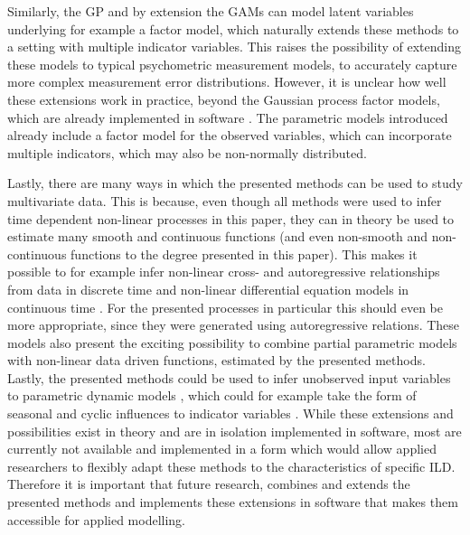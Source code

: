 \documentclass[man, floatsintext]{apa7}
\begin{document}
Similarly, the GP and by extension the GAMs can model latent variables
underlying for example a factor model, which naturally extends these methods to
a setting with multiple indicator variables. This raises the possibility of
extending these models to typical psychometric measurement models, to
accurately capture more complex measurement error distributions. However, it
is unclear how well these extensions work in practice, beyond the Gaussian
process factor models, which are already implemented in software
\parencite{clark_dynamic_2023}. The parametric models introduced already
include a factor model for the observed variables, which can incorporate
multiple indicators, which may also be non-normally distributed.

Lastly, there are many ways in which the presented methods can be used to study
multivariate data. This is because, even though all methods were used to infer
time dependent non-linear processes in this paper, they can in theory be used
to estimate many smooth and continuous functions (and even non-smooth and
non-continuous functions to the degree presented in this paper). This makes it
possible to for example infer non-linear cross- and autoregressive
relationships from data in discrete time \parencite{wood_generalized_2006,
  rasmussen_gaussian_2006, eleftheriadis_identification_2017} and non-linear
differential equation models in continuous time
\parencite{yildiz_learning_2018}. For the presented processes in particular
this should even be more appropriate, since they were generated using
autoregressive relations. These models also present the exciting possibility to
combine partial parametric models with non-linear data driven functions,
estimated by the presented methods. Lastly, the presented methods could be used
to infer unobserved input variables to parametric dynamic models
\parencite{alvarez_latent_2009,nayek_gaussian_2019}, which could for example
take the form of seasonal and cyclic influences to indicator variables
\parencite{clark_dynamic_2023}. While these extensions and possibilities exist
in theory and are in isolation implemented in software, most are currently not
available and implemented in a form which would allow applied researchers to
flexibly adapt these methods to the characteristics of specific ILD\@.
Therefore it is important that future research, combines and extends the
presented methods and implements these extensions in software that makes them
accessible for applied modelling.

\printbibliography[]
\end{document}
